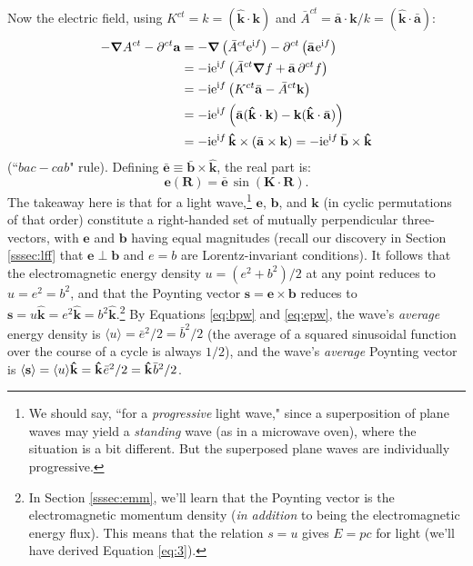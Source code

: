 \documentclass[12pt]{article}
\renewcommand{\vv}[1]{\mathbf{#1}}
\newcommand{\del}{\boldsymbol{\nabla}}
\begin{document}
Now the electric field, using $K^{ct} = k = (\vv{\hat{k}} \cdot \vv k)$ and $\bar{A}^{ct} = \bar{\vv a} \cdot \vv k / k = (\vv{\hat{k}} \cdot \bar{\vv a} )$:
\begin{equation*}
\begin{aligned}
- \del A^{ct} - \partial^{ct} \vv a &= - \del \left( \bar{A}^{ct} \mathrm{e}^{\mathrm{i} f} \right) - \partial^{ct} \left( \bar{\vv a} \mkern1mu \mathrm{e}^{\mathrm{i} f} \right) \\
&= - \mathrm{i} \mathrm{e}^{\mathrm{i} f} \left( \bar{A}^{ct} \del f + \bar{\vv a} \, \partial^{ct} f \right) \\
&= - \mathrm{i} \mathrm{e}^{\mathrm{i} f} \left( K^{ct} \bar{\vv a} - \bar{A}^{ct} \vv k \right) \\[1pt]
&= - \mathrm{i} \mathrm{e}^{\mathrm{i} f} \left( \bar{\vv a} (\vv{\hat{k}} \cdot \vv k )  - \vv k (\vv{\hat{k}} \cdot \bar{\vv a} ) \right) \\[1pt]
&= - \mathrm{i} \mathrm{e}^{\mathrm{i} f} \, \vv{\hat{k}} \times (\bar{\vv a} \times \vv k) = - \mathrm{i} \mathrm{e}^{\mathrm{i} f} \, \bar{\vv b} \times \vv{\hat{k}}
\end{aligned}
\end{equation*}
(``$bac - cab$" rule). Defining $\bar{\vv e} \equiv \bar{\vv b} \times \vv{\hat{k}}$, the real part is:
\begin{equation}\label{eq:epw}
\vv e (\vv R) = \bar{\vv e} \, \sin \left( \vv K \cdot \vv R \right) .
\end{equation}
The takeaway here is that for a light wave,\footnote{We should say, ``for a \emph{progressive} light wave," since a superposition of plane waves may yield a \emph{standing} wave (as in a microwave oven), where the situation is a bit different. But the superposed plane waves are individually progressive.} $\vv e$, $\vv b$, and $\vv k$ (in cyclic permutations of that order) constitute a right-handed set of mutually perpendicular three-vectors, with $\vv e$ and $\vv b$ having equal magnitudes (recall our discovery in Section \ref{sssec:lff} that $\vv e \perp \vv b$ and $e = b$ are Lorentz-invariant conditions). It follows that the electromagnetic energy density $u = (e^2 + b^2) / 2$ at any point reduces to $u = e^2 = b^2$, and that the Poynting vector $\vv s = \vv e \times \vv b$ reduces to $\vv s = u \vv{\hat{k}} = e^2 \vv{\hat{k}} = b^2 \vv{\hat{k}}$.\footnote{\label{fn:epc}In Section \ref{sssec:emm}, we'll learn that the Poynting vector is the electromagnetic momentum density (\emph{in addition} to being the electromagnetic energy flux). This means that the relation $s = u$ gives $E = pc$ for light (we'll have derived Equation \ref{eq:3}).} By Equations \ref{eq:bpw} and \ref{eq:epw}, the wave's \emph{average} energy density is $\langle u \rangle = \bar{e}^2 / 2 = \bar{b}^2 / 2$ (the average of a squared sinusoidal function over the course of a cycle is always $1/2$), and the wave's \emph{average} Poynting vector is $\langle \vv s \rangle = \langle u \rangle \vv{\hat{k}} = \vv{\hat{k}} \mkern1mu \bar{e}^2 / 2 = \vv{\hat{k}} \mkern1mu \bar{b}^2 / 2$.
\end{document}
